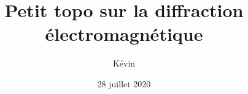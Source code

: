 \documentclass{bredelebeamer}
\title[Diffraction électromagnétique]{Petit topo sur la diffraction
électromagnétique}
\subtitle{}
\author{Kévin \bsc{Unger}}
\date{28 juillet 2020}
\begin{document}
\begin{frame}
   \titlepage
\end{frame}
\end{document}
